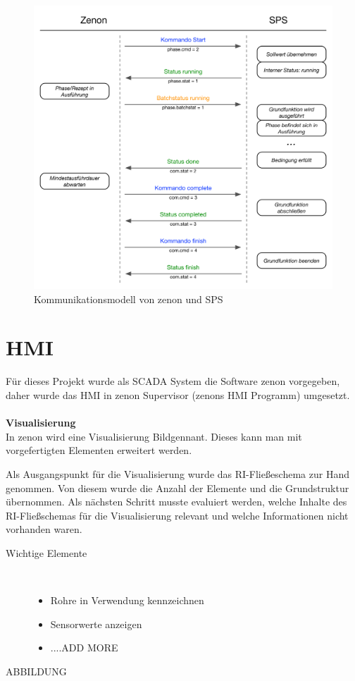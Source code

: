 \begin{figure}[h!]
  \centering
  \includegraphics[height=0.95\textwidth]{graphics/implementation/StateMachine.jpg}
  \caption{Kommunikationsmodell von zenon und SPS}
\end{figure}

\section{HMI}
Für dieses Projekt wurde als SCADA System die Software zenon vorgegeben, daher wurde das HMI in zenon Supervisor (zenons HMI Programm) umgesetzt.\\
\\
\textbf{Visualisierung}\\
In zenon wird eine Visualisierung  \glqq Bild\grqq\space  gennant. Dieses kann man mit vorgefertigten Elementen erweitert werden. 

Als Ausgangspunkt für die Visualisierung wurde das RI-Fließeschema zur Hand genommen. Von diesem wurde die Anzahl der Elemente und die Grundstruktur übernommen. Als nächsten Schritt musste evaluiert werden, welche Inhalte des RI-Fließschemas für die Visualisierung relevant und welche Informationen nicht vorhanden waren.
\begin{description}
\item[Wichtige Elemente]~\par
	\begin{itemize}
		\item Rohre in Verwendung kennzeichnen
		\item Sensorwerte anzeigen
		\item ....ADD MORE
	\end{itemize}
\end{description}
ABBILDUNG\\

